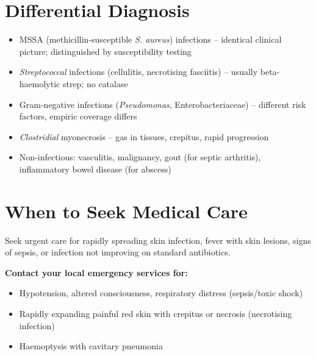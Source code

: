 \section*{Differential Diagnosis}
\begin{itemize}
    \item MSSA (methicillin-susceptible \textit{S. aureus}) infections -- identical clinical picture; distinguished by susceptibility testing
    \item \textit{Streptococcal} infections (cellulitis, necrotising fasciitis) -- usually beta-haemolytic strep; no catalase
    \item Gram-negative infections (\textit{Pseudomonas}, Enterobacteriaceae) -- different risk factors, empiric coverage differs
    \item \textit{Clostridial} myonecrosis -- gas in tissues, crepitus, rapid progression
    \item Non-infectious: vasculitis, malignancy, gout (for septic arthritis), inflammatory bowel disease (for abscess)
\end{itemize}

\section*{When to Seek Medical Care}
Seek urgent care for rapidly spreading skin infection, fever with skin lesions, signs of sepsis, or infection not improving on standard antibiotics.

\textbf{Contact your local emergency services for:}
\begin{itemize}
    \item Hypotension, altered consciousness, respiratory distress (sepsis/toxic shock)
    \item Rapidly expanding painful red skin with crepitus or necrosis (necrotising infection)
    \item Haemoptysis with cavitary pneumonia
\end{itemize}

